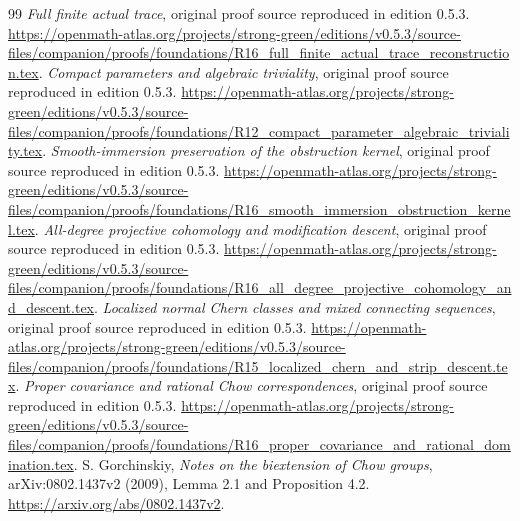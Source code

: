 \documentclass[11pt,a4paper]{article}
\theoremstyle{definition}
\numberwithin{equation}{section}
\begin{document}
\begin{thebibliography}{99}
 \emph{Full finite actual trace}, original proof source reproduced in edition 0.5.3. \url{https://openmath-atlas.org/projects/strong-green/editions/v0.5.3/source-files/companion/proofs/foundations/R16_full_finite_actual_trace_reconstruction.tex}.
 \emph{Compact parameters and algebraic triviality}, original proof source reproduced in edition 0.5.3. \url{https://openmath-atlas.org/projects/strong-green/editions/v0.5.3/source-files/companion/proofs/foundations/R12_compact_parameter_algebraic_triviality.tex}.
 \emph{Smooth-immersion preservation of the obstruction kernel}, original proof source reproduced in edition 0.5.3. \url{https://openmath-atlas.org/projects/strong-green/editions/v0.5.3/source-files/companion/proofs/foundations/R16_smooth_immersion_obstruction_kernel.tex}.
 \emph{All-degree projective cohomology and modification descent}, original proof source reproduced in edition 0.5.3. \url{https://openmath-atlas.org/projects/strong-green/editions/v0.5.3/source-files/companion/proofs/foundations/R16_all_degree_projective_cohomology_and_descent.tex}.
 \emph{Localized normal Chern classes and mixed connecting sequences}, original proof source reproduced in edition 0.5.3. \url{https://openmath-atlas.org/projects/strong-green/editions/v0.5.3/source-files/companion/proofs/foundations/R15_localized_chern_and_strip_descent.tex}.
 \emph{Proper covariance and rational Chow correspondences}, original proof source reproduced in edition 0.5.3. \url{https://openmath-atlas.org/projects/strong-green/editions/v0.5.3/source-files/companion/proofs/foundations/R16_proper_covariance_and_rational_domination.tex}.
 S. Gorchinskiy, \emph{Notes on the biextension of Chow groups}, arXiv:0802.1437v2 (2009), Lemma 2.1 and Proposition 4.2. \url{https://arxiv.org/abs/0802.1437v2}.
\end{thebibliography}
\end{document}
